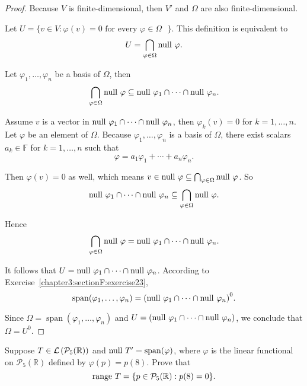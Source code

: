 \begin{proof}
    Because $V$ is finite-dimensional, then $V'$ and $\Omega$ are also finite-dimensional.

    Let $U = \{ v\in V: \varphi(v) = 0 \text{ for every $\varphi\in \Omega$ } \}$. This definition is equivalent to
    \[
        U = \bigcap_{\varphi\in \Omega} \operatorname{null}\,{\varphi}.
    \]

    Let $\varphi_{1}, \ldots, \varphi_{n}$ be a basis of $\Omega$, then
    \[
        \bigcap_{\varphi\in \Omega} \operatorname{null}\,{\varphi} \subseteq \operatorname{null}\,{\varphi_{1}}\cap \cdots\cap \operatorname{null}\,{\varphi_{n}}.
    \]

    Assume $v$ is a vector in $\operatorname{null}\,{\varphi_{1}}\cap \cdots\cap \operatorname{null}\,{\varphi_{n}}$, then $\varphi_{k}(v) = 0$ for $k = 1, \ldots, n$. Let $\varphi$ be an element of $\Omega$. Because $\varphi_{1}, \ldots, \varphi_{n}$ is a basis of $\Omega$, there exist scalars $a_{k}\in \mathbb{F}$ for $k = 1,\ldots, n$ such that
    \[
        \varphi = a_{1}\varphi_{1} + \cdots + a_{n}\varphi_{n}.
    \]

    Then $\varphi(v) = 0$ as well, which means $v\in \operatorname{null}\,{\varphi}\subseteq \bigcap_{\varphi\in \Omega} \operatorname{null}\,{\varphi}$. So
    \[
        \operatorname{null}\,{\varphi_{1}}\cap \cdots\cap \operatorname{null}\,{\varphi_{n}} \subseteq \bigcap_{\varphi\in \Omega} \operatorname{null}\,{\varphi}.
    \]

    Hence
    \[
        \bigcap_{\varphi\in \Omega} \operatorname{null}\,{\varphi} = \operatorname{null}\,{\varphi_{1}}\cap \cdots\cap \operatorname{null}\,{\varphi_{n}}.
    \]

    It follows that $U = \operatorname{null}\,{\varphi_{1}}\cap\cdots\cap\operatorname{null}\,{\varphi_{n}}$. According to Exercise~\ref{chapter3:sectionF:exercise23},
    \[
        \operatorname{span}(\varphi_{1}, \ldots, \varphi_{n}) = {\left(\operatorname{null}\,{\varphi_{1}}\cap\cdots\cap\operatorname{null}\,{\varphi_{n}}\right)}^{0}.
    \]

    Since $\Omega = \operatorname{span}(\varphi_{1}, \ldots, \varphi_{n})$ and $U = \left(\operatorname{null}\,{\varphi_{1}}\cap\cdots\cap\operatorname{null}\,{\varphi_{n}}\right)$, we conclude that $\Omega = U^{0}$.
\end{proof}
\newpage

\begin{exercise}\label{chapter3:sectionF:exercise27}
    Suppose $T\in \mathcal{L}\left({\mathcal{P}_{5}(\mathbb{R})}\right)$ and $\operatorname{null}\,{T'} = \operatorname{span}(\varphi)$, where $\varphi$ is the linear functional on $\mathcal{P}_{5}(\mathbb{R})$ defined by $\varphi(p) = p(8)$. Prove that
    \[
        \operatorname{range}\,{T} = \{ p\in\mathcal{P}_{5}(\mathbb{R}): p(8) = 0 \}    .
    \]
\end{exercise}

